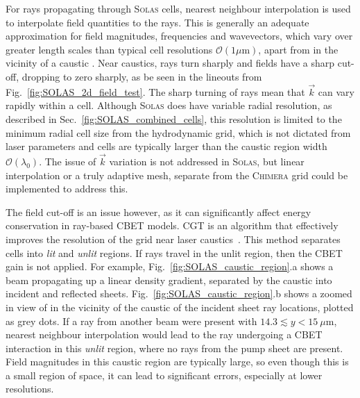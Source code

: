 For rays propagating through \textsc{Solas} cells, nearest neighbour interpolation is used to interpolate field quantities to the rays.
This is generally an adequate approximation for field magnitudes, frequencies and wavevectors, which vary over greater length scales than typical cell resolutions $\mathcal{O}(1 \mu\text{m})$, apart from in the vicinity of a caustic \cite{follett_validation_2022}.
Near caustics, rays turn sharply and fields have a sharp cut-off, dropping to zero sharply, as be seen in the lineouts from Fig.~\ref{fig:SOLAS_2d_field_test}.
The sharp turning of rays mean that $\vec{k}$ can vary rapidly within a cell.
Although \textsc{Solas} does have variable radial resolution, as described in Sec.~\ref{fig:SOLAS_combined_cells}, this resolution is limited to the minimum radial cell size from the hydrodynamic grid, which is not dictated from laser parameters and cells are typically larger than the caustic region width $\mathcal{O}(\lambda_0)$.
The issue of $\vec{k}$ variation is not addressed in \textsc{Solas}, but linear interpolation or a truly adaptive mesh, separate from the \textsc{Chimera} grid could be implemented to address this.

The field cut-off is an issue however, as it can significantly affect energy conservation in ray-based \ac{CBET} models.
\ac{CGT} is an algorithm that effectively improves the resolution of the grid near laser caustics~\cite{follett_ray-based_2018}.
This method separates cells into \textit{lit} and \textit{unlit} regions.
If rays travel in the unlit region, then the \ac{CBET} gain is not applied.
For example, Fig.~\ref{fig:SOLAS_caustic_region}.a shows a beam propagating up a linear density gradient, separated by the caustic into incident and reflected sheets.
Fig.~\ref{fig:SOLAS_caustic_region}.b shows a zoomed in view of in the vicinity of the caustic of the incident sheet ray locations, plotted as grey dots.
If a ray from another beam were present with $14.3 \lesssim y < 15\ \mu\text{m}$, nearest neighbour interpolation would lead to the ray undergoing a \ac{CBET} interaction in this \textit{unlit} region, where no rays from the pump sheet are present.
Field magnitudes in this caustic region are typically large, so even though this is a small region of space, it can lead to significant errors, especially at lower resolutions.

